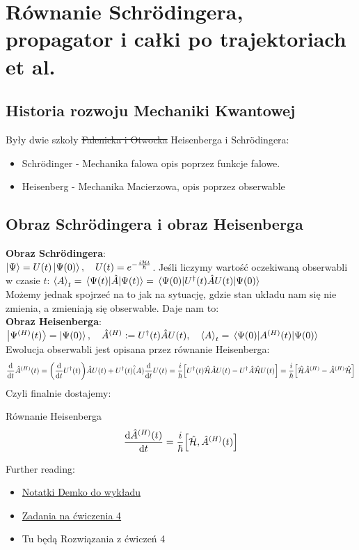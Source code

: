 \documentclass[12pt,a4paper]{report}
\newcommand{\subind}[2]{{\color{blue} #1\index{#2}}}
\newcommand{\link}[2]{{\color{cyan} \href{#1}{#2}}}
\newcommand{\HS}{\mathcal{H}}
\newcommand{\psket}[1]{\ket{\Psi(#1)}}
\renewcommand{\emph}{\textbf}
\newenvironment{lecture}[1]{\par\medskip
   \noindent\chapter{#1} \rmfamily}{\medskip}
\newenvironment{emph_box}[1]
    {\begin{center}\color{BrickRed}
    \begin{tabular}{|p{0.9\textwidth}|}
    \hline
    \begin{center} \color{Dandelion}{\textbf{#1}} \end{center}
    \begin{center}
    }
    {
    \end{center}
    \\\\\hline
    \end{tabular} 
    \end{center}
    \color{black}
    }
\begin{document}
\begin{lecture}{Równanie Schrödingera, propagator i całki po trajektoriach et al.}
\section{Historia rozwoju Mechaniki Kwantowej}
Były dwie szkoły \sout{Falenicka i Otwocka} Heisenberga i Schrödingera:
\begin{itemize}
    \item Schrödinger - Mechanika falowa opis poprzez funkcje falowe.
    \item Heisenberg - Mechanika Macierzowa, opis poprzez obserwable
\end{itemize}
\section{Obraz Schrödingera i obraz Heisenberga}
\label{sec:lec_5:schrodinger_heisenberg}
\emph{Obraz Schrödingera}:\\
$\ket{\Psi} = U(t) \psket{0}\qc U(t) = e^{- \frac{i \HS t}{\hbar}}$. Jeśli liczymy wartość oczekiwaną obserwabli w czasie $t$: $\ev{A}_t = \ev{\hat{A}}{\Psi(t)} = \ev{U^\dagger(t) \hat{A} U(t)}{\Psi(0)}$\\
Możemy jednak spojrzeć na to jak na sytuację, gdzie stan układu nam się nie zmienia, a zmieniają się obserwable. Daje nam to:\\
\emph{Obraz Heisenberga}:\\
$\ket{\Psi^{(H)}(t)} = \psket{0} \qc \hat{A}^{(H)} := U^\dagger (t) \hat{A} U(t)\qc \ev{A}_t = \ev{A^{(H)}(t)}{\Psi(0)}$\\
Ewolucja obserwabli jest opisana przez równanie Heisenberga:\\
\[
    \dv{t} \hat{A}^{(H)}(t) = \qty(\dv{t} U^\dagger (t)) \hat{A} U(t) + U^\dagger(t) \hat(A) \dv{t} U(t) = \frac{i}{\hbar} \qty[U^\dagger(t) \hat{\HS} \hat{A} U(t) - U^\dagger \hat{A} \hat{\HS} U(t)] = \frac{i}{\hbar} \qty[\hat{\HS}\hat{A}^{(H)} - \hat{A}^{(H)}\hat{\HS}]
\]
Czyli finalnie dostajemy:

\begin{emph_box}{\subind{Równanie Heisenberga}{Równanie!Heisenberga}}
    \begin{equation}
        \dv{\hat{A}^{(H)}(t)}{t} = \frac{i}{\hbar} \qty[\hat{\HS}, \hat{A}^{(H)}(t)]
        \label{eq:lec_5:heisenberg}
    \end{equation}
\end{emph_box}

Further reading:
\begin{itemize}
    \item \link{http://studenci.fuw.edu.pl/~kc427902/Prezentacje_Kwanty/wyklad4-schroedinger.pdf}{Notatki Demko do wykładu}
    \item \link{http://studenci.fuw.edu.pl/~kc427902/Prezentacje_Kwanty/cwiczenia4.pdf}{Zadania na ćwiczenia 4}
    \item Tu będą Rozwiązania z ćwiczeń 4
\end{itemize}


\end{lecture}
\end{document}
